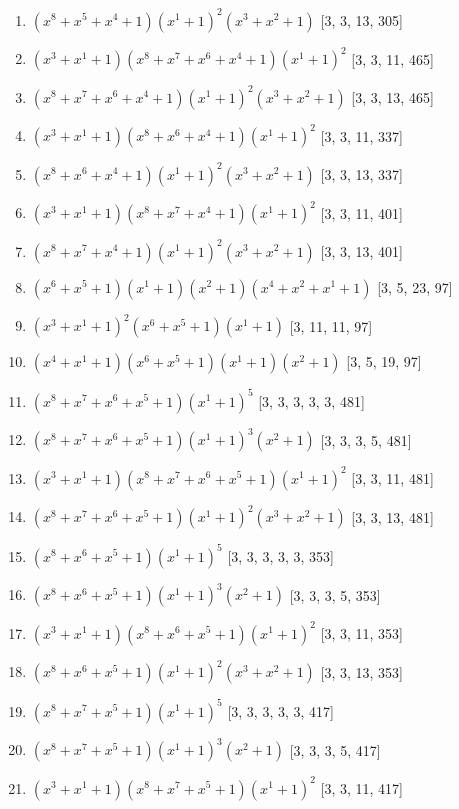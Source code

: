 \documentclass[10pt,twocolumn]{article}
\begin{document}
\begin{enumerate}
\item $(x^{8} + x^{5} + x^{4} + 1)(x^{1} + 1)^{2}(x^{3} + x^{2} + 1)$  [3, 3, 13, 305]
\item $(x^{3} + x^{1} + 1)(x^{8} + x^{7} + x^{6} + x^{4} + 1)(x^{1} + 1)^{2}$  [3, 3, 11, 465]
\item $(x^{8} + x^{7} + x^{6} + x^{4} + 1)(x^{1} + 1)^{2}(x^{3} + x^{2} + 1)$  [3, 3, 13, 465]
\item $(x^{3} + x^{1} + 1)(x^{8} + x^{6} + x^{4} + 1)(x^{1} + 1)^{2}$  [3, 3, 11, 337]
\item $(x^{8} + x^{6} + x^{4} + 1)(x^{1} + 1)^{2}(x^{3} + x^{2} + 1)$  [3, 3, 13, 337]
\item $(x^{3} + x^{1} + 1)(x^{8} + x^{7} + x^{4} + 1)(x^{1} + 1)^{2}$  [3, 3, 11, 401]
\item $(x^{8} + x^{7} + x^{4} + 1)(x^{1} + 1)^{2}(x^{3} + x^{2} + 1)$  [3, 3, 13, 401]
\item $(x^{6} + x^{5} + 1)(x^{1} + 1)(x^{2} + 1)(x^{4} + x^{2} + x^{1} + 1)$  [3, 5, 23, 97]
\item $(x^{3} + x^{1} + 1)^{2}(x^{6} + x^{5} + 1)(x^{1} + 1)$  [3, 11, 11, 97]
\item $(x^{4} + x^{1} + 1)(x^{6} + x^{5} + 1)(x^{1} + 1)(x^{2} + 1)$  [3, 5, 19, 97]
\item $(x^{8} + x^{7} + x^{6} + x^{5} + 1)(x^{1} + 1)^{5}$  [3, 3, 3, 3, 3, 481]
\item $(x^{8} + x^{7} + x^{6} + x^{5} + 1)(x^{1} + 1)^{3}(x^{2} + 1)$  [3, 3, 3, 5, 481]
\item $(x^{3} + x^{1} + 1)(x^{8} + x^{7} + x^{6} + x^{5} + 1)(x^{1} + 1)^{2}$  [3, 3, 11, 481]
\item $(x^{8} + x^{7} + x^{6} + x^{5} + 1)(x^{1} + 1)^{2}(x^{3} + x^{2} + 1)$  [3, 3, 13, 481]
\item $(x^{8} + x^{6} + x^{5} + 1)(x^{1} + 1)^{5}$  [3, 3, 3, 3, 3, 353]
\item $(x^{8} + x^{6} + x^{5} + 1)(x^{1} + 1)^{3}(x^{2} + 1)$  [3, 3, 3, 5, 353]
\item $(x^{3} + x^{1} + 1)(x^{8} + x^{6} + x^{5} + 1)(x^{1} + 1)^{2}$  [3, 3, 11, 353]
\item $(x^{8} + x^{6} + x^{5} + 1)(x^{1} + 1)^{2}(x^{3} + x^{2} + 1)$  [3, 3, 13, 353]
\item $(x^{8} + x^{7} + x^{5} + 1)(x^{1} + 1)^{5}$  [3, 3, 3, 3, 3, 417]
\item $(x^{8} + x^{7} + x^{5} + 1)(x^{1} + 1)^{3}(x^{2} + 1)$  [3, 3, 3, 5, 417]
\item $(x^{3} + x^{1} + 1)(x^{8} + x^{7} + x^{5} + 1)(x^{1} + 1)^{2}$  [3, 3, 11, 417]

\end{enumerate}
\end{document}
